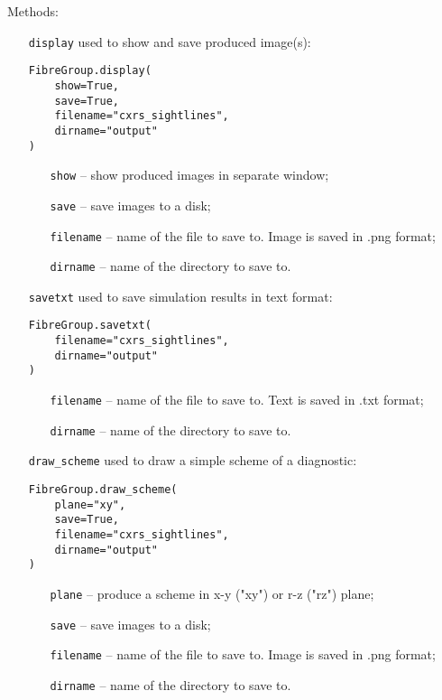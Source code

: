 \documentclass[../../main]{subfiles}
\begin{document}
Methods:
\begin{itemize}[align=left]
    \item[\texttt{display}] used to show and save produced image(s):
          \begin{verbatim}
FibreGroup.display(
    show=True,
    save=True,
    filename="cxrs_sightlines",
    dirname="output"
)
        \end{verbatim}
          \begin{itemize}[align=left]
              \item[\texttt{show}] -- show produced images in separate window;
              \item[\texttt{save}] -- save images to a disk;
              \item[\texttt{filename}] -- name of the file to save to. Image is saved in .png format;
              \item[\texttt{dirname}] -- name of the directory to save to.
          \end{itemize}

    \item[\texttt{savetxt}] used to save simulation results in text format:
          \begin{verbatim}
FibreGroup.savetxt(
    filename="cxrs_sightlines",
    dirname="output"
)
        \end{verbatim}
          \begin{itemize}[align=left]
              \item[\texttt{filename}] -- name of the file to save to. Text is saved in .txt format;
              \item[\texttt{dirname}] -- name of the directory to save to.
          \end{itemize}

    \item[\texttt{draw\_scheme}] used to draw a simple scheme of a diagnostic:
          \begin{verbatim}
FibreGroup.draw_scheme(
    plane="xy",
    save=True,
    filename="cxrs_sightlines",
    dirname="output"
)
        \end{verbatim}
          \begin{itemize}[align=left]
              \item[\texttt{plane}] -- produce a scheme in x-y ("xy") or r-z ("rz") plane;
              \item[\texttt{save}] -- save images to a disk;
              \item[\texttt{filename}] -- name of the file to save to. Image is saved in .png format;
              \item[\texttt{dirname}] -- name of the directory to save to.
          \end{itemize}
\end{itemize}
\end{document}
